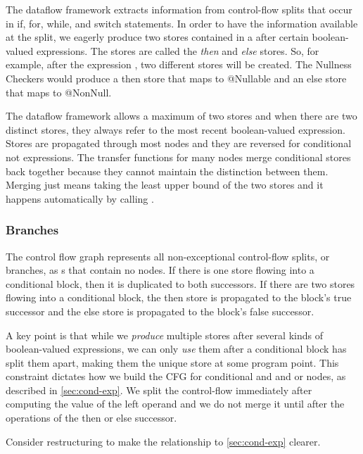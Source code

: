 The dataflow framework extracts information from control-flow splits that occur in if, for, while, and switch statements.  In order to have the information available at the split, we eagerly produce two stores contained in a  after certain boolean-valued expressions.  The stores are called the \emph{then} and \emph{else} stores.  So, for example, after the expression , two different stores will be created.  The Nullness Checkers would produce a then store that maps  to @Nullable and an else store that maps  to @NonNull.

The dataflow framework allows a maximum of two stores and when there are two distinct stores, they always refer to the most recent boolean-valued expression.  Stores are propagated through most nodes and they are reversed for conditional not expressions.  The transfer functions for many nodes merge conditional stores back together because they cannot maintain the distinction between them.  Merging just means taking the least upper bound of the two stores and it happens automatically by
calling .


\subsubsection{Branches}

The control flow graph represents all non-exceptional control-flow splits, or branches, as s that contain no nodes.  If there is one store flowing into a conditional block, then it is duplicated to both successors.  If there are two stores flowing into a conditional block, the then store is propagated to the block's true successor and the else store is propagated to the block's false successor.

A key point is that while we \emph{produce} multiple stores after several kinds of boolean-valued expressions, we can only \emph{use} them after a conditional block has split them apart, making them the unique store at some program point.  This constraint dictates how we build the CFG for conditional and and or nodes, as described in \autoref{sec:cond-exp}.  We split the control-flow immediately after computing the value of the left operand and we do not merge it until after the operations of the then or else successor.

\begin{workinprogress}
  Consider restructuring to make the relationship to \autoref{sec:cond-exp}
  clearer.
\end{workinprogress}

